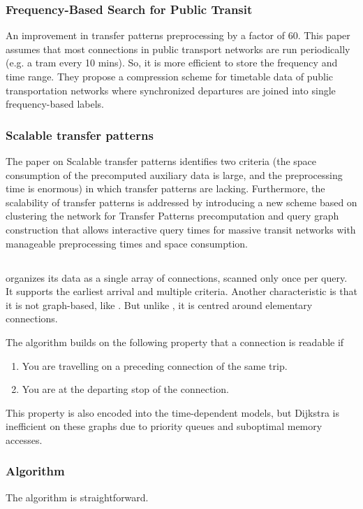 \subsubsection{Frequency-Based Search for Public Transit}
An improvement in transfer patterns preprocessing by a factor of 60. This paper\cite{bast_frequency-based_2014} assumes that most connections in public transport networks are run periodically (e.g. a tram every 10 mins). So, it is more efficient to store the frequency and time range. They propose a compression scheme for timetable data of public transportation networks where synchronized departures are joined into single frequency-based labels.
\subsubsection{Scalable transfer patterns}
The paper on Scalable transfer patterns \cite{bast_scalable_2015} identifies two criteria (the space consumption of the precomputed auxiliary data is large, and the preprocessing time is enormous) in which transfer patterns are lacking. Furthermore, the scalability of transfer patterns is addressed by introducing a new scheme based on clustering the network for Transfer Patterns precomputation and query graph construction that allows interactive query times for massive transit networks with manageable preprocessing times and space consumption. 
\subsection{}
 \cite{dibbelt_intriguingly_2013} organizes its data as a single array of connections, scanned only once per query. It supports the earliest arrival and multiple criteria. Another characteristic is that it is not graph-based, like . But unlike , it is centred around elementary connections.

The algorithm builds on the following property that a connection is readable if \begin{enumerate}
    \item You are travelling on a preceding connection of the same trip. 
    \item You are at the departing stop of the connection.
\end{enumerate}
This property is also encoded into the time-dependent models\cite{pyrga_efficient_2008}, but Dijkstra is inefficient on these graphs due to priority queues and suboptimal memory accesses. 
\subsubsection{Algorithm}
The  algorithm is straightforward. 

